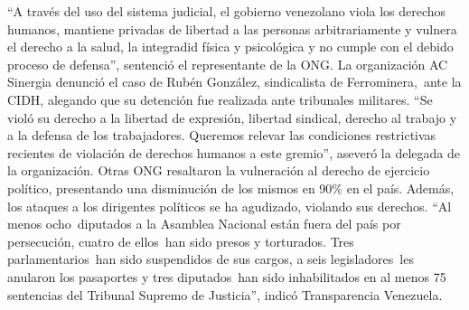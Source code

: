 \documentclass{article}%
\begin{document}
\newline%
%
“A través del uso del sistema judicial, el gobierno venezolano viola los derechos humanos, mantiene privadas de libertad a las personas arbitrariamente y vulnera el derecho a la salud, la integradid física y psicológica y no cumple con el debido proceso de defensa”, sentenció el representante de la ONG.%
\newline%
%
La organización AC Sinergia denunció el caso de Rubén González, sindicalista de Ferrominera,~ante la CIDH, alegando que su detención fue realizada ante tribunales militares. “Se violó su derecho a la libertad de expresión, libertad sindical, derecho al trabajo y a la defensa de los trabajadores. Queremos relevar las condiciones restrictivas recientes de violación de derechos humanos a este gremio”, aseveró la delegada de la organización.%
\newline%
%
Otras ONG resaltaron la vulneración al derecho de ejercicio político, presentando una disminución de los mismos en 90\% en el país. Además, los ataques a los dirigentes políticos se ha agudizado, violando sus derechos.%
\newline%
%
“Al menos ocho~diputados a la Asamblea Nacional están fuera del país por persecución, cuatro de ellos~han sido presos y torturados. Tres parlamentarios~han sido suspendidos de sus cargos, a seis legisladores~les anularon los pasaportes y tres diputados~han sido inhabilitados en al menos 75 sentencias del Tribunal Supremo de Justicia”, indicó Transparencia Venezuela.%
\newline%
%
\end{document}
